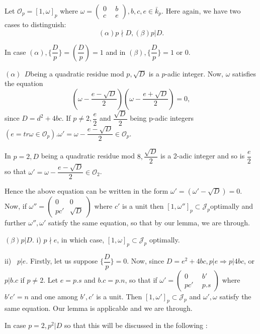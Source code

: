  Let $\mathscr{O}_p = [1, \omega]_p$ where $\omega
 = \begin{pmatrix}0~&~b\\c~&~e \end{pmatrix}, b,c,e \in
 \bar{k}_p$. Here again, we have two cases to distinguish: 
 $$
 (\alpha) p \nmid D, (\beta) p | D.
 $$
 
 In case $(\alpha), \Bigg\{\dfrac{D}{p}\Bigg\} = \left(\dfrac{D}{p}\right) = 1$
 and in $(\beta), \Bigg\{\dfrac{D}{p}\Bigg\} = 1$ or $0$. 
 
 $(\alpha) ~~D$\pageoriginale being a quadratic residue mod $p, \sqrt{D}$ is a
 $p$-adic integer. Now, $\omega$ satisfies the equation 
 $$
 \left(\omega - \frac{e - \sqrt{D}}{2}\right) \left(\omega - \frac{e +
   \sqrt{D}}{2}\right) =0, 
  $$
 since $D = d^2 + 4bc$. If $p \neq 2, \dfrac{e}{2}$ and
 $\dfrac{\sqrt{D}}{2}$ being p-adic integers $(e = tr \omega \in
 \mathscr{O}_p). \omega'  = \omega  - \dfrac{e - \sqrt{D}}{2} \in
 \mathscr{O}_p$. 
 
 In $p = 2, D$ being a quadratic residue mod $8, \dfrac{\sqrt{D}}{2}$
 is a 2-adic integer and so is $\dfrac{e}{2}$ so that $\omega'  =
 \omega  - \dfrac{e - \sqrt{D}}{2} \in \mathscr{O}_2$. 
 
 Hence the above equation can be written in the form $\omega'  =
 (\omega'  -  \sqrt{D})=0$. Now, if $\omega'' = \begin{pmatrix}0&0
   \\ pc'& \sqrt{D} \end{pmatrix}$ where $c'$ is a unit then $[1, \omega'']_p
 \subset \mathcal{J}_p$\pageoriginale optimally and further $\omega'', \omega'$
 satisfy the same equation, so that by our lemma, we are through. 
 
 $(\beta) p | D$. i) $p \nmid e$, in which case, $[1, \omega ]_p \subset
 \mathcal{J}_p$ optimally. 
 
 ii)~ $p | e$. Firstly, let us suppose $\Bigg\{\dfrac{D}{p}\Bigg\}  =
 0$. Now, since $D= e^2 + 4 bc, p | e \Longrightarrow p | 4 bc$, or $p
 | b. c$ if $p \neq 2$. Let $e =  p.  s$ and $b.c = p.n$, so that if
 $\omega' =\begin{pmatrix} 0 ~&~ b' \\ pc' ~&~ p. s \end{pmatrix} $
 where $b' c'  = n$ and one among $b', c'$ is a unit. Then $[1,
   \omega']_p \subset \mathcal{J}_p$ and $\omega', \omega$ satisfy the
 same equation. Our lemma is applicable and we are through. 
 
 In case $p = 2, p^2 | D$ so that this will be discussed in the following : 
 
